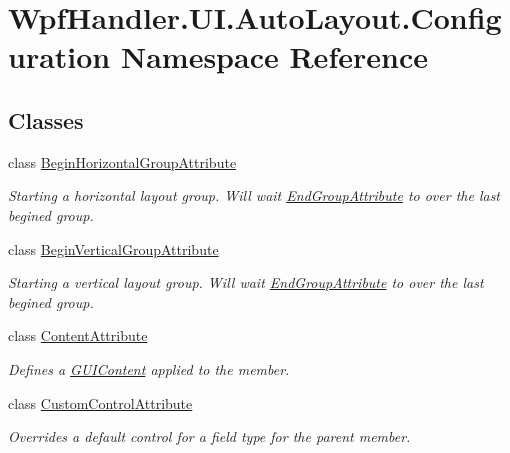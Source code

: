 \hypertarget{namespace_wpf_handler_1_1_u_i_1_1_auto_layout_1_1_configuration}{}\section{Wpf\+Handler.\+U\+I.\+Auto\+Layout.\+Configuration Namespace Reference}
\label{namespace_wpf_handler_1_1_u_i_1_1_auto_layout_1_1_configuration}
\subsection*{Classes}
\begin{DoxyCompactItemize}
\item 
class \mbox{\hyperlink{class_wpf_handler_1_1_u_i_1_1_auto_layout_1_1_configuration_1_1_begin_horizontal_group_attribute}{Begin\+Horizontal\+Group\+Attribute}}
\begin{DoxyCompactList}\small\item\em Starting a horizontal layout group. Will wait \mbox{\hyperlink{class_wpf_handler_1_1_u_i_1_1_auto_layout_1_1_configuration_1_1_end_group_attribute}{End\+Group\+Attribute}} to over the last begined group. \end{DoxyCompactList}\item 
class \mbox{\hyperlink{class_wpf_handler_1_1_u_i_1_1_auto_layout_1_1_configuration_1_1_begin_vertical_group_attribute}{Begin\+Vertical\+Group\+Attribute}}
\begin{DoxyCompactList}\small\item\em Starting a vertical layout group. Will wait \mbox{\hyperlink{class_wpf_handler_1_1_u_i_1_1_auto_layout_1_1_configuration_1_1_end_group_attribute}{End\+Group\+Attribute}} to over the last begined group. \end{DoxyCompactList}\item 
class \mbox{\hyperlink{class_wpf_handler_1_1_u_i_1_1_auto_layout_1_1_configuration_1_1_content_attribute}{Content\+Attribute}}
\begin{DoxyCompactList}\small\item\em Defines a \mbox{\hyperlink{class_wpf_handler_1_1_u_i_1_1_g_u_i_content}{G\+U\+I\+Content}} applied to the member. \end{DoxyCompactList}\item 
class \mbox{\hyperlink{class_wpf_handler_1_1_u_i_1_1_auto_layout_1_1_configuration_1_1_custom_control_attribute}{Custom\+Control\+Attribute}}
\begin{DoxyCompactList}\small\item\em Overrides a default control for a field type for the parent member. \end{DoxyCompactList}\item 

\end{DoxyCompactItemize}
